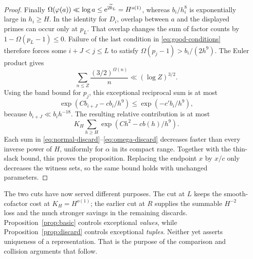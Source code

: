 \begin{proof}
Finally \(\Omega(\varphi(a))\ll\log a\le\mathrm e^{2\widetilde b_L}
=H^{o(1)}\), whereas \(b_i/h_i^8\) is exponentially large in
\(h_i\ge H\).  In the identity for \(D_i\), overlap between \(a\)
and the displayed primes can occur only at \(p_L\).
That overlap changes the sum of factor counts by
\(1-\Omega(p_L-1)\le0\).
Failure of the last condition in \eqref{eq:good-conditions}
therefore forces some \(i+J<j\le L\) to satisfy
\(\Omega(p_j-1)>b_i/(2h^9)\).
The Euler product gives
\[
 \sum_{n\le Z}\frac{(3/2)^{\Omega(n)}}n\ll(\log Z)^{3/2}.
\]
Using the band bound for \(p_j\), this exceptional reciprocal sum
is at most
\[
 \exp(Cb_{i+J}-cb_i/h^9)\le\exp(-c'b_i/h^9),
\]
because \(b_{i+J}\ll b_i h^{-18}\).
The resulting relative contribution is at most
\begin{equation}\label{eq:omega-discard}
 K_H\sum_{h\ge H}\exp(Ch^2-cb(h)/h^9).
\end{equation}
Each sum in \eqref{eq:normal-discard}--\eqref{eq:omega-discard}
decreases faster than every inverse power of \(H\), uniformly for
\(\alpha\) in its compact range.  Together with the thin-slack
bound, this proves the proposition.  Replacing the endpoint \(x\)
by \(x/c\) only decreases the witness sets, so the same bound holds
with unchanged parameters.
\end{proof}

The two cuts have now served different purposes.  The cut at \(L\)
keeps the smooth-cofactor cost at \(K_H=H^{o(1)}\); the earlier
cut at \(R\) supplies the summable \(H^{-2}\) loss and the much
stronger savings in the remaining discards.  Proposition~\ref{prop:basic}
controls exceptional \emph{values}, while
Proposition~\ref{prop:discard} controls exceptional \emph{tuples}.
Neither yet asserts uniqueness of a representation.  That is the
purpose of the comparison and collision arguments that follow.
